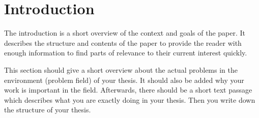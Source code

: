 \chapter{Introduction}
The introduction is a short overview of the context and goals of the paper.
It describes the structure and contents of the paper
to provide the reader with enough information
to find parts of relevance to their current interest quickly.

This section should give a short overview about the actual problems in the environment (problem field) of your thesis. It should also be added why your work is important in the field. Afterwards, there should be a short text passage which describes what you are exactly doing in your thesis. Then you write down the structure of your thesis.
\newpage

